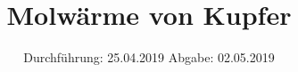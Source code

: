 

\subject{VERSUCH NUMMER 47}
\title{Molwärme von Kupfer}
\date{
  Durchführung: 25.04.2019
  \hspace{3em}
  Abgabe: 02.05.2019
}



\thispagestyle{empty}
\maketitle
\thispagestyle{empty}
\tableofcontents
\newpage
\setcounter{page}{1}


% 




\nocite{*}
\printbibliography


